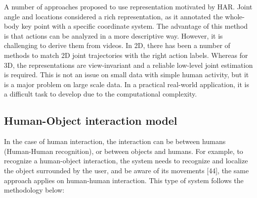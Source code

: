 A number of approaches proposed to use representation motivated by HAR. Joint angle and locations considered a rich representation, as it annotated the whole-body key point with a specific coordinate system. The advantage of this method is that actions can be analyzed in a more descriptive way. However, it is challenging to derive them from videos. In 2D, there has been a number of methods to match 2D joint trajectories with the right action labels. Whereas for 3D, the representations are view-invariant and a reliable low-level joint estimation is required. This is not an issue on small data with simple human activity, but it is a major problem on large scale data. In a practical real-world application, it is a difficult task to develop due to the computational complexity.


\subsection{Human-Object interaction model}
\hspace{5mm} In the case of human interaction, the interaction can be between humans (Human-Human recognition), or between objects and humans. For example, to recognize a human-object interaction, the system needs to recognize and localize the object surrounded by the user, and be aware of its movements [44], the same approach applies on human-human interaction. This type of system follows the methodology below:\\

